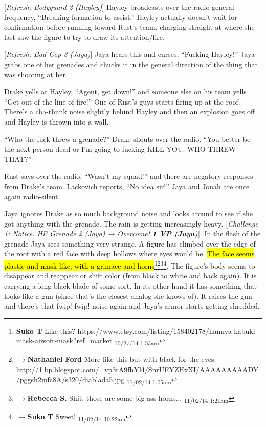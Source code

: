 {[}\textit{Refresh: Bodyguard 2 (Hayley)}{]} Hayley broadcasts over the radio general frequency, ``Breaking formation to assist.''  Hayley actually doesn't wait for confirmation before running toward Rust's team, charging straight at where she last saw the figure to try to draw its attention/fire.



{[}\textit{Refresh: Bad Cop 3 (Jaya)}{]} Jaya hears this and curses, ``Fucking Hayley!''  Jaya grabs one of her grenades and chucks it in the general direction of the thing that was shooting at her.



Drake yells at Hayley, ``Agent, get down!''  and someone else on his team yells ``Get out of the line of fire!''  One of Rust's guys starts firing up at the roof.  There's a cha-thunk noise slightly behind Hayley and then an explosion goes off and Hayley is thrown into a wall.



``Who the fuck threw a grenade?'' Drake shouts over the radio.  ``You better be the next person dead or I'm going to fucking KILL YOU.  WHO THREW THAT?''

Rust says over the radio, ``Wasn't my squad!'' and there are negatory responses from Drake's team.  Lackovich reports, ``No idea sir!''  Jaya and Jonah are once again radio-silent.



Jaya ignores Drake as so much background noise and looks around to see if she got anything with the grenade.  The rain is getting increasingly heavy.  {[}\textit{Challenge 1: Notice.  HE Grenade 2 (Jaya) → Overcome! }\textit{\textbf{1 VP (Jaya)}}{]}.  In the flash of the grenade Jaya sees something very strange.  A figure has climbed over the edge of the roof with a red face with deep hollows where eyes would be. \hl{The face seems plastic and mask-like, with a grimace and horns}\footnote{\textbf{Suko T }Like this?
https://www.etsy.com/listing/158402178/hannya-kabuki-mask-airsoft-mask?ref=market \textsubscript{10/27/14 1:53am}}\footnote{$\rightarrow$\textbf{Nathaniel Ford }More like this but with black for the eyes:
http://1.bp.blogspot.com/\_vp3tA9fhYl4/SnrUFYZHxXI/AAAAAAAAADY/pggsh2mfc8A/s320/diablada5.jpg \textsubscript{11/02/14 1:05am}}\footnote{$\rightarrow$\textbf{Rebecca S. }Shit, those are some big ass horns... \textsubscript{11/02/14 1:21am}}\footnote{$\rightarrow$\textbf{Suko T }Sweet! \textsubscript{11/02/14 10:22am}}.  The figure's body seems to disappear and reappear or shift color (from black to white and back again).  It is carrying a long black blade of some sort.  In its other hand it has something that looks like a gun (since that's the closest analog she knows of).  It raises the gun and there's that fwip! fwip! noise again and Jaya's armor starts getting shredded.



